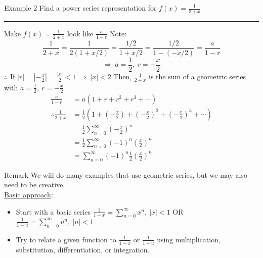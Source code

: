\documentclass[12pt,a4paper]{article}
\begin{document}
\begin{eg}{Example 2}
	Find a power series representation for $\displaystyle f(x)=\frac{1}{2+x}$\\
	\noindent\rule[0.25\baselineskip]{\textwidth}{1pt}
	Make $\displaystyle f(x)=\frac{1}{2+x}$ look like $\displaystyle\frac{a}{1-r}$
	Note: 
	$$\frac{1}{2+x}=\frac{1}{2(1+x/2)}=\frac{1/2}{1+x/2}=\frac{1/2}{1-(-x/2)}=\frac{a}{1-r}$$
	$$\Rightarrow\ a=\frac{1}{2},\ r=-\frac{x}{2}$$
	$\therefore$ If $\displaystyle |r|=\left|-\frac{x}{2}\right|=\frac{|x|}{2}<1\ \Rightarrow\ |x|<2$
	Then, $\displaystyle\frac{1}{2+x}$ is the sum of a geometric series with $\displaystyle a=\frac{1}{2},\ r=-\frac{x}{2}$
	$$\begin{aligned}
		\frac{a}{1-r}&=a(1+r+r^2+r^3+\cdots)\\
		\therefore\frac{1}{2+x}&=\frac{1}{2}\left(1+\left(-\frac{x}{2}\right)+\left(-\frac{x}{2}\right)^2+\left(-\frac{x}{2}\right)^3+\cdots\right)\\
		&=\frac{1}{2}\sum^\infty_{n=0}\left(-\frac{x}{2}\right)^n\\
		&=\frac{1}{2}\sum^\infty_{n=0}(-1)^n\left(\frac{x}{2}\right)^n\\
		&=\sum^\infty_{n=0}(-1)^n\frac{1}{2}\left(\frac{x}{2}\right)^n
	\end{aligned}$$
\end{eg}
\begin{rmk}{Remark}
	We will do many examples that use geometric series, but we may also need to be creative.\\
	\newline
	\underline{Basic approach}:
	\begin{itemize}
		\item Start with a basic series $\displaystyle\frac{1}{1-x}=\sum^\infty_{n=0}x^n,\ |x|<1$ OR $\displaystyle\frac{1}{1-u}=\sum^\infty_{n=0}u^n,\ |u|<1$
		\item Try to relate a given function to $\displaystyle\frac{1}{1-x}$ or $\displaystyle\frac{1}{1-u}$ using multiplication, substitution, differentiation, or integration. 
	\end{itemize}	
\end{rmk}
\end{document}
